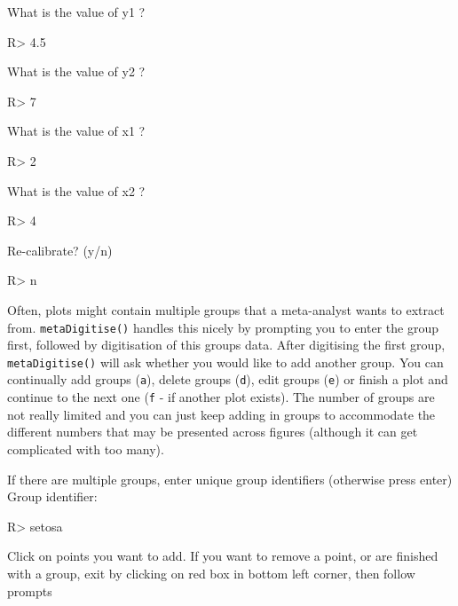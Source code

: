 \documentclass[12pt]{article}
\newcommand{\code}[1]{\texttt{#1}}
\newcommand{\fct}[1]{\texttt{#1()}}
\begin{document}
\begin{CodeChunk}
\begin{CodeOutput}
What is the value of y1 ?
\end{CodeOutput}
\begin{CodeInput}
R> 4.5
\end{CodeInput}
\begin{CodeOutput}
What is the value of y2 ?
\end{CodeOutput}
\begin{CodeInput}
R> 7
\end{CodeInput}
\begin{CodeOutput}
What is the value of x1 ?
\end{CodeOutput}
\begin{CodeInput}
R> 2
\end{CodeInput}
\begin{CodeOutput}
What is the value of x2 ?
\end{CodeOutput}
\begin{CodeInput}
R> 4
\end{CodeInput}
\begin{CodeOutput}
Re-calibrate? (y/n) 
\end{CodeOutput}
\begin{CodeInput}
R> n
\end{CodeInput}
\end{CodeChunk}

Often, plots might contain multiple groups that a meta-analyst wants to extract from. \fct{metaDigitise} handles this nicely by prompting you to enter the group first, followed by digitisation of this groups data. After digitising the first group, \fct{metaDigitise} will ask whether you would like to add another group. You can continually add groups (\code{a}), delete groups (\code{d}), edit groups (\code{e}) or finish a plot and continue to the next one (\code{f} - if another plot exists). 
The number of groups are not really limited and you can just keep adding in groups to accommodate the different numbers that may be presented across figures (although it can get complicated with too many).

\begin{CodeChunk}
\begin{CodeOutput}
If there are multiple groups, enter unique group identifiers (otherwise press enter)
Group identifier: 
\end{CodeOutput}
\begin{CodeInput}
R> setosa
\end{CodeInput}
\begin{CodeOutput}
Click on points you want to add.
If you want to remove a point, or are finished with a group, 
exit by clicking on red box in bottom left corner, then follow prompts
\end{CodeOutput}
\end{CodeChunk}
\end{document}
